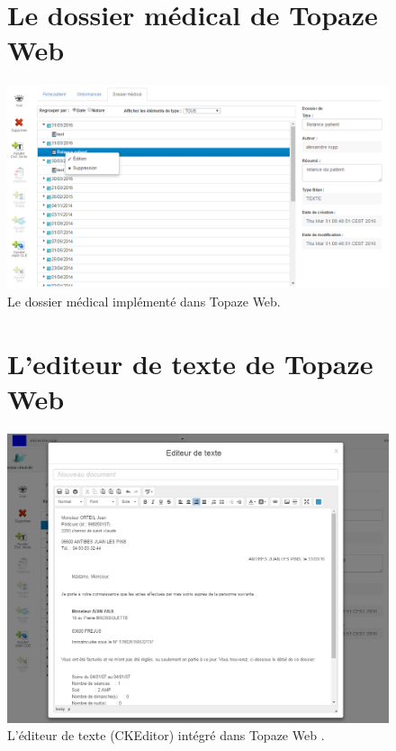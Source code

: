 \begin{appendices}
\begin{figure}[H]
\section*{Le dossier médical de Topaze Web}
  \centering
  \includegraphics[width=18cm]{./img/dossier_medical_web2}
  \caption{\label{fig:dossier_web} Le dossier médical implémenté dans Topaze Web.}
\end{figure}

\newpage
\begin{figure}[H]
\section*{L'editeur de texte de Topaze Web}
  \centering
  \includegraphics[width=18cm]{./img/editeur_topaze_web}
  \caption{\label{fig:editeur_web} L'éditeur de texte (CKEditor) intégré dans Topaze Web .}
\end{figure}


\end{appendices}

